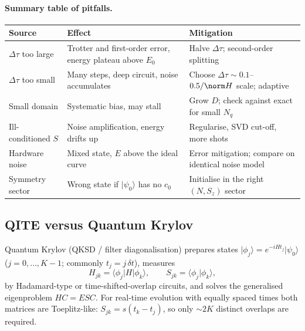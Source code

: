 \documentclass[11pt,a4paper]{article}
\newcommand{\ket}[1]{\lvert #1\rangle}
\newcommand{\bra}[1]{\langle #1\rvert}
\newcommand{\braket}[2]{\langle #1\vert #2\rangle}
\begin{document}
\paragraph{Summary table of pitfalls.}
\begin{center}
\small\begin{tabular}{@{}p{3cm}p{4.8cm}p{5.4cm}@{}}
\toprule
Source & Effect & Mitigation\\
\midrule
$\Delta\tau$ too large & Trotter and first-order error, energy plateau above $E_0$ & Halve $\Delta\tau$; second-order splitting\\
$\Delta\tau$ too small & Many steps, deep circuit, noise accumulates & Choose $\Delta\tau\sim0.1$--$0.5/\norm H$ scale; adaptive\\
Small domain & Systematic bias, may stall & Grow $D$; check against exact for small $N_q$\\
Ill-conditioned $S$ & Noise amplification, energy drifts up & Regularise, SVD cut-off, more shots\\
Hardware noise & Mixed state, $E$ above the ideal curve & Error mitigation; compare on identical noise model\\
Symmetry sector & Wrong state if $\ket{\psi_0}$ has no $c_0$ & Initialise in the right $(N,S_z)$ sector\\
\bottomrule
\end{tabular}
\end{center}

\subsection{QITE versus Quantum Krylov}\label{sec:krylov}

Quantum Krylov (QKSD / filter diagonalisation) prepares states
$\ket{\phi_j}=e^{-iHt_j}\ket{\psi_0}$ ($j=0,\dots,K-1$; commonly $t_j=j\,\delta t$), measures
\begin{equation}
  H_{jk}=\bra{\phi_j}H\ket{\phi_k},\qquad S_{jk}=\braket{\phi_j}{\phi_k},
\end{equation}
by Hadamard-type or time-shifted-overlap circuits, and solves the generalised eigenproblem
$HC=ESC$. For real-time evolution with equally spaced times both matrices are Toeplitz-like:
$S_{jk}=s(t_k-t_j)$, so only $\sim 2K$ distinct overlaps are required.
\end{document}
